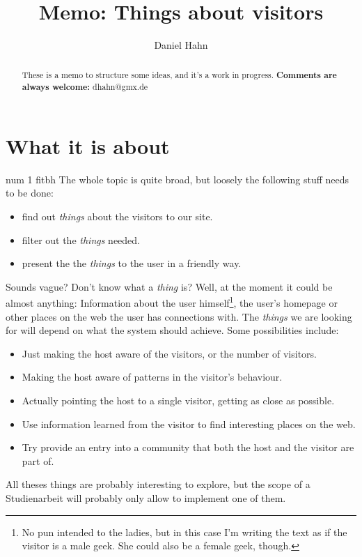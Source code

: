 \documentclass[a4paper]{danarticle}
\begin{document}
  \author{Daniel Hahn}
  \title{Memo: Things about visitors}
  \maketitle
 
  \begin{abstract}
     These is a memo to structure some ideas, and it's a work in 
     progress. \textbf{Comments are always welcome:} dhahn@gmx.de
  \end{abstract}
 
  \section*{What it is about}
\pdfdest num 1 fitbh
    The whole topic is quite broad, but loosely the following stuff needs to be
    done:
    \begin{itemize}
      \item{find out \textit{things} about the visitors to our site.}
      \item{filter out the \textit{things} needed.}
      \item{present the the \textit{things} to the user in a friendly way.}
    \end{itemize} 
    Sounds vague? Don't know what a \textit{thing} is? Well, at the moment it
    could be almost anything: Information about the user himself\footnote{No pun
    intended to the ladies, but in this case I'm writing the text as if the
    visitor is a male geek. She could also be a female geek, though.}, the user's
    homepage or other places on the web the user has connections with.
    The \textit{things} we are looking for will depend on what the system
    should achieve. Some possibilities include:
    \begin{itemize}
       \item{Just making the host aware of the visitors, or the number of
             visitors.}
       \item{Making the host aware of patterns in the visitor's behaviour.}
       \item{Actually pointing the host to a single visitor, getting as close
             as possible.}
       \item{Use information learned from the visitor to find interesting
             places on the web.}
       \item{Try provide an entry into a community that both the host and
             the visitor are part of.}
    \end{itemize}
    All theses things are probably interesting to explore, but the scope of a
    Studienarbeit will probably only allow to implement one of them.
\end{document}

